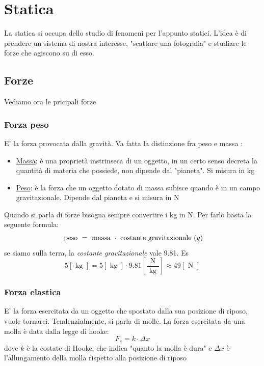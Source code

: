 \section{Statica}
La statica si occupa dello studio di fenomeni per l'appunto statici. L'idea è di prendere un sistema di nostra interesse, "scattare una fotografia" e studiare le forze che agiscono su di esso.
\subsection{Forze}
Vediamo ora le pricipali forze
\subsubsection{Forza peso}
E' la forza provocata dalla gravità. Va fatta la distinzione fra peso e massa :
\begin{itemize}
	\item \underline{Massa}: è una proprietà instrinseca di un oggetto, in un certo senso decreta la quantità di materia che possiede, non dipende dal "pianeta". Si misura in kg
	\item \underline{Peso}: è la forza che un oggetto dotato di massa subisce quando è in un campo gravitazionale. Dipende dal pianeta e si misura in N
\end{itemize}
Quando si parla di forze bisogna sempre convertire i kg in N. Per farlo basta la seguente formula:
\[
	\text{ peso } = \text{ massa } \cdot \text{ costante gravitazionale ($ g $)}
\]
se siamo sulla terra, la \textit{costante gravitazionale} vale 9.81. Es
\[
	5 \left[\text{ kg }\right] = 5 \left[\text{ kg }\right] \cdot 9.81 \left[\frac{\text{ N }}{\text{ kg }}\right] \approx 49 \left[\text{ N }\right]
\]

\subsubsection{Forza elastica}
E' la forza esercitata da un oggetto che spostato dalla sua posizione di riposo, vuole tornarci. Tendenzialmente, si parla di molle. La forza esercitata da una molla è data dalla legge di hooke:
\[
	F_{e} = k \cdot \Delta x
\]
dove $ k $ è la costate di Hooke, che indica "quanto la molla è dura" e $ \Delta x $ è l'allungamento della molla rispetto alla posizione di riposo
